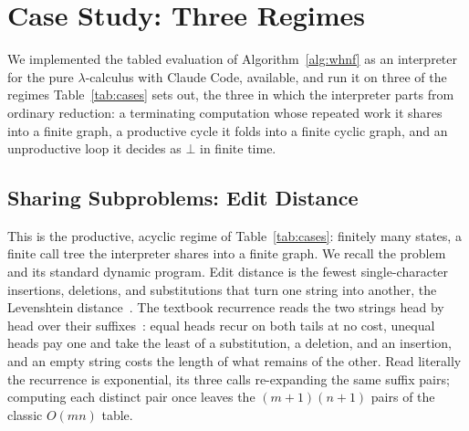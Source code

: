 \section{Case Study: Three Regimes}\label{sec:application}

We implemented the tabled evaluation of Algorithm~\ref{alg:whnf} as an interpreter for the pure $\lambda$-calculus with Claude Code, available, and run it on three of the regimes Table~\ref{tab:cases} sets out, the three in which the interpreter parts from ordinary reduction: a terminating computation whose repeated work it shares into a finite graph, a productive cycle it folds into a finite cyclic graph, and an unproductive loop it decides as $\bot$ in finite time.

\subsection{Sharing Subproblems: Edit Distance}\label{sec:application-sharing}

This is the productive, acyclic regime of Table~\ref{tab:cases}: finitely many states, a finite call tree the interpreter shares into a finite graph. We recall the problem and its standard dynamic program. Edit distance is the fewest single-character insertions, deletions, and substitutions that turn one string into another, the Levenshtein distance~\cite{levenshtein1966-binary-codes}. The textbook recurrence reads the two strings head by head over their suffixes~\cite{wagner1974-string-correction}: equal heads recur on both tails at no cost, unequal heads pay one and take the least of a substitution, a deletion, and an insertion, and an empty string costs the length of what remains of the other. Read literally the recurrence is exponential, its three calls re-expanding the same suffix pairs; computing each distinct pair once leaves the $(m{+}1)(n{+}1)$ pairs of the classic $O(mn)$ table.

